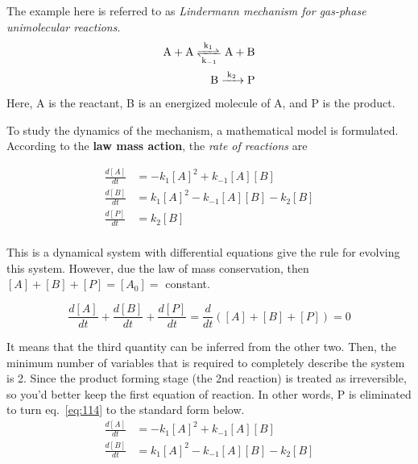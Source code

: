 The example here is referred to as {\it Lindermann mechanism for
  gas-phase unimolecular reactions}. 
\begin{equation}
  \label{eq:113}
  \begin{split}
      \ce{A + A <=>[k_1][k_{-1}] A + B} \\
      \ce{B ->[k_2] P}
  \end{split}
\end{equation}
Here, A is the reactant, B is an energized molecule of A, and P is the
product.

To study the dynamics of the mechanism, a mathematical model is
formulated. According to the {\bf law mass action}, the
{\it rate of reactions} are

\begin{equation}
  \label{eq:114}
  \begin{split}
    \frac{d[A]}{dt} &= -k_1[A]^2 + k_{-1}[A][B] \\
    \frac{d[B]}{dt} &= k_1[A]^2 - k_{-1}[A][B] - k_2[B] \\
    \frac{d[P]}{dt} &= k_2[B] \\
  \end{split}
\end{equation}

This is a dynamical system with differential equations give the rule
for evolving this system. However, due the law of mass conservation,
then $[A]+[B]+[P]=[A_0]=$ constant.

\begin{equation}
  \label{eq:115}
  \frac{d[A]}{dt} + \frac{d[B]}{dt} + \frac{d[P]}{dt} = \frac{d}{dt}([A]+[B]+[P])
  = 0
\end{equation}

It means that the third quantity can be inferred from the other two.
Then, the minimum number of variables that is required to completely
describe the system is 2.  Since the product forming stage (the 2nd
reaction) is treated as irreversible, so you'd better keep the first
equation of reaction. In other words, P is eliminated to turn
eq.~\eqref{eq:114} to the standard form below.
\begin{equation}
  \label{eq:258}
    \begin{split}
    \frac{d[A]}{dt} &= -k_1[A]^2 + k_{-1}[A][B] \\
    \frac{d[B]}{dt} &= k_1[A]^2 - k_{-1}[A][B] - k_2[B] \\
  \end{split}
\end{equation}

